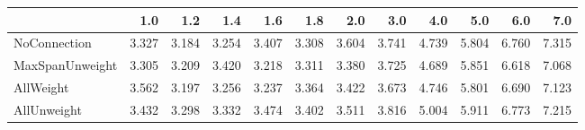 \begin{tabular}{lrrrrrrrrrrr}
\toprule
{} &   1.0 &   1.2 &   1.4 &   1.6 &   1.8 &   2.0 &   3.0 &   4.0 &   5.0 &   6.0 &   7.0 \\
\midrule
NoConnection    & 3.327 & 3.184 & 3.254 & 3.407 & 3.308 & 3.604 & 3.741 & 4.739 & 5.804 & 6.760 & 7.315 \\
MaxSpanUnweight & 3.305 & 3.209 & 3.420 & 3.218 & 3.311 & 3.380 & 3.725 & 4.689 & 5.851 & 6.618 & 7.068 \\
AllWeight       & 3.562 & 3.197 & 3.256 & 3.237 & 3.364 & 3.422 & 3.673 & 4.746 & 5.801 & 6.690 & 7.123 \\
AllUnweight     & 3.432 & 3.298 & 3.332 & 3.474 & 3.402 & 3.511 & 3.816 & 5.004 & 5.911 & 6.773 & 7.215 \\
\bottomrule
\end{tabular}
